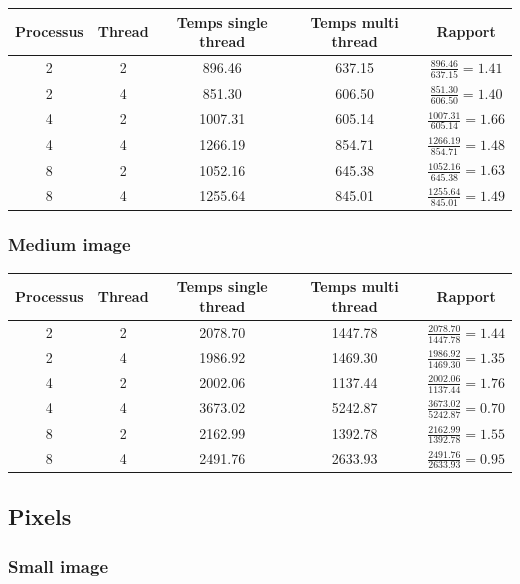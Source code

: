 \documentclass{article}
\begin{document}
\begin{tabular}{ | c | c | c | c | c | }
  \hline
  Processus & Thread & Temps single thread & Temps multi thread & Rapport \\
  \hline
  2 & 2 & 896.46 & 637.15 & $ \frac{896.46}{637.15} = 1.41 $ \\
  2 & 4 & 851.30 & 606.50 & $ \frac{851.30}{606.50} = 1.40 $ \\
  4 & 2 & 1007.31 & 605.14 & $ \frac{1007.31}{605.14} = 1.66 $ \\
  4 & 4 & 1266.19 & 854.71 & $ \frac{1266.19}{854.71} = 1.48 $ \\
  8 & 2 & 1052.16 & 645.38 & $ \frac{1052.16}{645.38} = 1.63 $ \\
  8 & 4 & 1255.64 & 845.01 & $ \frac{1255.64}{845.01} = 1.49 $ \\
  \hline
\end{tabular}

\subsubsection{Medium image}

\begin{tabular}{ | c | c | c | c | c | }
  \hline
  Processus & Thread & Temps single thread & Temps multi thread & Rapport \\
  \hline
  2 & 2 & 2078.70 & 1447.78 & $ \frac{2078.70}{1447.78} = 1.44 $ \\
  2 & 4 & 1986.92 & 1469.30 & $ \frac{1986.92}{1469.30} = 1.35 $ \\
  4 & 2 & 2002.06 & 1137.44 & $ \frac{2002.06}{1137.44} = 1.76 $ \\
  4 & 4 & 3673.02 & 5242.87 & $ \frac{3673.02}{5242.87} = 0.70 $ \\
  8 & 2 & 2162.99 & 1392.78 & $ \frac{2162.99}{1392.78} = 1.55 $ \\
  8 & 4 & 2491.76 & 2633.93 & $ \frac{2491.76}{2633.93} = 0.95 $ \\
  \hline
\end{tabular}


\subsection{Pixels}

\subsubsection{Small image}
\end{document}
